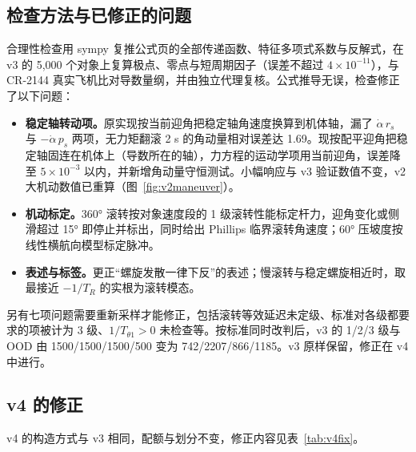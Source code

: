 \documentclass[UTF8,a4paper,11pt,fontset=fandol,scheme=plain]{ctexart}
\begin{document}
\subsection{检查方法与已修正的问题}
合理性检查用 sympy 复推公式页的全部传递函数、特征多项式系数与反解式，在 v3 的 5,000 个对象上复算极点、零点与短周期因子（误差不超过 \(4\times10^{-11}\)），与 CR-2144 真实飞机比对导数量纲，并由独立代理复核。公式推导无误，检查修正了以下问题：
\begin{itemize}[leftmargin=1.5em]
\item \textbf{稳定轴转动项。}原实现按当前迎角把稳定轴角速度换算到机体轴，漏了 \(\dot\alpha\,r_s\) 与 \(-\dot\alpha\,p_s\) 两项，无力矩翻滚 2 s 的角动量相对误差达 1.69。现按配平迎角把稳定轴固连在机体上（导数所在的轴），力方程的运动学项用当前迎角，误差降至 \(5\times10^{-3}\) 以内，并新增角动量守恒测试。小幅响应与 v3 验证数值不变，v2 大机动数值已重算（图~\ref{fig:v2maneuver}）。
\item \textbf{机动标定。}360° 滚转按对象速度段的 1 级滚转性能标定杆力，迎角变化或侧滑超过 15° 即停止并标出，同时给出 Phillips 临界滚转角速度；60° 压坡度按线性横航向模型标定脉冲。
\item \textbf{表述与标签。}更正“螺旋发散一律下反”的表述；慢滚转与稳定螺旋相近时，取最接近 \(-1/T_R\) 的实根为滚转模态。
\end{itemize}

另有七项问题需要重新采样才能修正，包括滚转等效延迟未定级、标准对各级都要求的项被计为 3 级、\(1/T_{\theta1}>0\) 未检查等。按标准同时改判后，v3 的 1/2/3 级与 OOD 由 1500/1500/1500/500 变为 742/2207/866/1185。v3 原样保留，修正在 v4 中进行。

\subsection{v4 的修正}
v4 的构造方式与 v3 相同，配额与划分不变，修正内容见表~\ref{tab:v4fix}。
\end{document}
